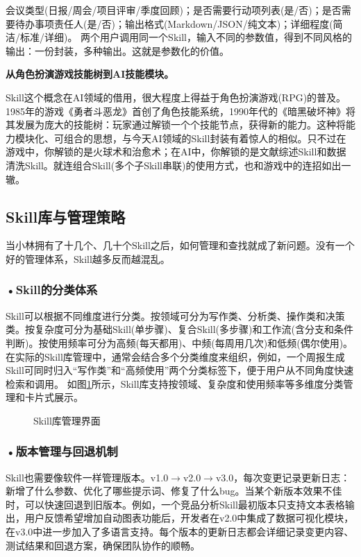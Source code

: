 会议类型(日报/周会/项目评审/季度回顾)；是否需要行动项列表(是/否)；是否需要待办事项责任人(是/否)；输出格式(Markdown/JSON/纯文本)；详细程度(简洁/标准/详细)。
两个用户调用同一个Skill，输入不同的参数值，得到不同风格的输出：一份封装，多种输出。这就是参数化的价值。
\begin{funbox}
\textbf{从角色扮演游戏技能树到AI技能模块。} 

Skill这个概念在AI领域的借用，很大程度上得益于角色扮演游戏(RPG)的普及。1985年的游戏《勇者斗恶龙》首创了角色技能系统，1990年代的《暗黑破坏神》将其发展为庞大的技能树：玩家通过解锁一个个技能节点，获得新的能力。这种将能力模块化、可组合的思想，与今天AI领域的Skill封装有着惊人的相似。只不过在游戏中，你解锁的是火球术和治愈术；在AI中，你解锁的是文献综述Skill和数据清洗Skill。就连组合Skill(多个子Skill串联)的使用方式，也和游戏中的连招如出一辙。
\end{funbox}

\subsection{Skill库与管理策略}

当小林拥有了十几个、几十个Skill之后，如何管理和查找就成了新问题。没有一个好的管理体系，Skill越多反而越混乱。


\subsubsection*{\textbf{•Skill的分类体系}}

Skill可以根据不同维度进行分类。按领域可分为写作类、分析类、操作类和决策类。按复杂度可分为基础Skill(单步骤)、复合Skill(多步骤)和工作流(含分支和条件判断)。按使用频率可分为高频(每天都用)、中频(每周用几次)和低频(偶尔使用)。在实际的Skill库管理中，通常会结合多个分类维度来组织，例如，一个周报生成Skill可同时归入“写作类”和“高频使用”两个分类标签下，便于用户从不同角度快速检索和调用。 如图\ref{fig:ch3_3_20}所示，Skill库支持按领域、复杂度和使用频率等多维度分类管理和卡片式展示。

\begin{figure}[H]
\centering
{}
\caption{Skill库管理界面}
\label{fig:ch3_3_20}
\end{figure}


\subsubsection*{\textbf{•版本管理与回退机制}}
Skill也需要像软件一样管理版本。v1.0$\rightarrow$v2.0$\rightarrow$v3.0，每次变更记录更新日志：新增了什么参数、优化了哪些提示词、修复了什么bug。当某个新版本效果不佳时，可以快速回退到旧版本。例如，一个竞品分析Skill最初版本只支持文本表格输出，用户反馈希望增加自动图表功能后，开发者在v2.0中集成了数据可视化模块，在v3.0中进一步加入了多语言支持。每个版本的更新日志都会详细记录变更内容、测试结果和回退方案，确保团队协作的顺畅。

